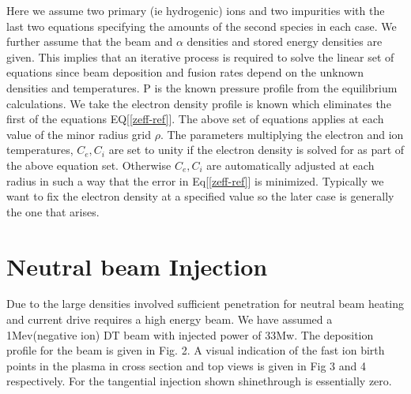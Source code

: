          Here we assume two primary (ie hydrogenic) ions and two
         impurities with the last two equations specifying the amounts
         of the second species in each case. We further assume that the beam
         and $ \alpha $ densities and stored energy densities are
         given. This implies that an iterative process is required to
         solve the linear set of equations since beam deposition and
         fusion rates depend on the unknown densities and
         temperatures. P is the known pressure
         profile from the equilibrium calculations. We
         take the electron density profile is known which
         eliminates the first of the equations EQ[\ref{zeff-ref}].
         The above set of equations applies at each value of the minor
         radius grid $\rho $. 
         The parameters multiplying the electron
         and ion temperatures, $C_e,C_i$ are set to unity if
         the electron density is solved for as part of the above
         equation set. Otherwise  $C_e,C_i$ are automatically adjusted at 
         each radius in such a way that the error in
         Eq[\ref{zeff-ref}] is minimized. Typically we want to fix
         the electron density at a specified value so the later case 
         is generally the one that arises.
         
         
         \begin{center}
          \end{center}
        \pagebreak



       \section{Neutral beam Injection}
       Due to the large densities involved sufficient penetration for
       neutral beam heating and current drive requires a high energy
       beam. We have assumed a 1Mev(negative ion)  DT beam with injected power of
       33Mw. The deposition profile for the beam is given in Fig. 2. A 
       visual indication of the fast ion birth points in the plasma
       in cross section and top views is given in Fig 3 and 4
       respectively. For the tangential injection shown shinethrough
       is essentially zero. 
           \\
          \\
           \\
           \\
        
